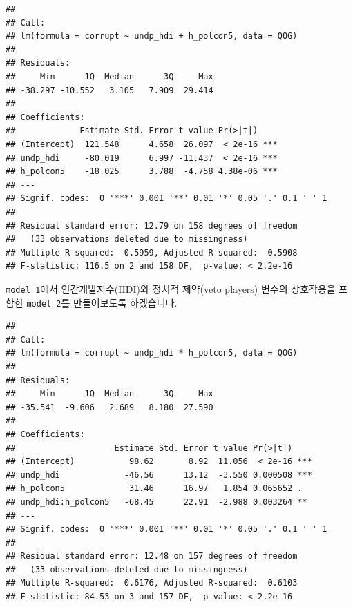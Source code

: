 \documentclass[]{book}
\newenvironment{Shaded}{\begin{snugshade}}{\end{snugshade}}
\newcommand{\DataTypeTok}[1]{\textcolor[rgb]{0.13,0.29,0.53}{#1}}
\newcommand{\KeywordTok}[1]{\textcolor[rgb]{0.13,0.29,0.53}{\textbf{#1}}}
\newcommand{\NormalTok}[1]{#1}
\newcommand{\OperatorTok}[1]{\textcolor[rgb]{0.81,0.36,0.00}{\textbf{#1}}}
\newcommand{\StringTok}[1]{\textcolor[rgb]{0.31,0.60,0.02}{#1}}
\begin{document}
\begin{verbatim}
## 
## Call:
## lm(formula = corrupt ~ undp_hdi + h_polcon5, data = QOG)
## 
## Residuals:
##     Min      1Q  Median      3Q     Max 
## -38.297 -10.552   3.105   7.909  29.414 
## 
## Coefficients:
##             Estimate Std. Error t value Pr(>|t|)    
## (Intercept)  121.548      4.658  26.097  < 2e-16 ***
## undp_hdi     -80.019      6.997 -11.437  < 2e-16 ***
## h_polcon5    -18.025      3.788  -4.758 4.38e-06 ***
## ---
## Signif. codes:  0 '***' 0.001 '**' 0.01 '*' 0.05 '.' 0.1 ' ' 1
## 
## Residual standard error: 12.79 on 158 degrees of freedom
##   (33 observations deleted due to missingness)
## Multiple R-squared:  0.5959, Adjusted R-squared:  0.5908 
## F-statistic: 116.5 on 2 and 158 DF,  p-value: < 2.2e-16
\end{verbatim}

\texttt{model\ 1}에서 인간개발지수(HDI)와 정치적 제약(veto players) 변수의 상호작용을 포함한 \texttt{model\ 2}를 만들어보도록 하겠습니다.

\begin{Shaded}
\end{Shaded}

\begin{verbatim}
## 
## Call:
## lm(formula = corrupt ~ undp_hdi * h_polcon5, data = QOG)
## 
## Residuals:
##     Min      1Q  Median      3Q     Max 
## -35.541  -9.606   2.689   8.180  27.590 
## 
## Coefficients:
##                    Estimate Std. Error t value Pr(>|t|)    
## (Intercept)           98.62       8.92  11.056  < 2e-16 ***
## undp_hdi             -46.56      13.12  -3.550 0.000508 ***
## h_polcon5             31.46      16.97   1.854 0.065652 .  
## undp_hdi:h_polcon5   -68.45      22.91  -2.988 0.003264 ** 
## ---
## Signif. codes:  0 '***' 0.001 '**' 0.01 '*' 0.05 '.' 0.1 ' ' 1
## 
## Residual standard error: 12.48 on 157 degrees of freedom
##   (33 observations deleted due to missingness)
## Multiple R-squared:  0.6176, Adjusted R-squared:  0.6103 
## F-statistic: 84.53 on 3 and 157 DF,  p-value: < 2.2e-16
\end{verbatim}
\end{document}
